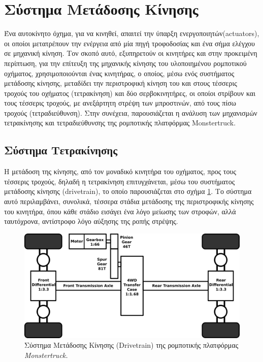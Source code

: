 \newpage
\section{Σύστημα Μετάδοσης Κίνησης} \label{sec:motion_transfer_system}
Ένα αυτοκίνητο όχημα, για να κινηθεί, απαιτεί την ύπαρξη {ενεργοποιητών(actuators)}, οι οποίοι μετατρέπουν την ενέργεια από μία πηγή τροφοδοσίας και ένα σήμα ελέγχου σε μηχανική κίνηση. Τον σκοπό αυτό, εξυπηρετούν οι κινητήρες και στην προκειμένη περίπτωση, για την επίτευξη της μηχανικής κίνησης του υλοποιημένου ρομποτικού οχήματος, χρησιμοποιούνται ένας κινητήρας, ο οποίος, μέσω ενός συστήματος μετάδοσης κίνησης, μεταδίδει την περιστροφική κίνηση του και στους τέσσερις τροχούς του οχήματος ({τετρακίνηση}) και δύο σερβοκινητήρες, οι οποίοι στρίβουν και τους τέσσερις τροχούς, με ανεξάρτητη στρέψη των μπροστινών, από τους πίσω τροχούς  ({τετραδιεύθυνση}). Στην συνέχεια, παρουσιάζεται η ανάλυση των μηχανισμών {τετρακίνησης} και {τετραδιεύθυνσης} της ρομποτικής πλατφόρμας {Monstertruck}.


\bigskip
\subsection{Σύστημα Τετρακίνησης} \label{ssec:four_wheel_drive}
Η μετάδοση της κίνησης, από τον μοναδικό κινητήρα του οχήματος, προς τους τέσσερις τροχούς, δηλαδή η τετρακίνηση επιτυγχάνεται, μέσω του {συστήματος μετάδοσης κίνησης (drivetrain)}, το οποίο παρουσιάζεται στο σχήμα \ref{fig:drivetrain}. Το σύστημα αυτό περιλαμβάνει, συνολικά, τέσσερα στάδια μετάδοσης της περιστροφικής κίνησης του κινητήρα, όπου κάθε στάδιο εισάγει ένα λόγο μείωσης των στροφών, αλλά ταυτόχρονα, αντίστροφο λόγο αύξησης της ροπής στρέψης.

\bigskip
\begin{figure}[!ht]
	\centering
	\includegraphics[width=0.8\linewidth]{Chapters/Chapter2/Figures/drivetrain.png}
	\caption{Σύστημα Μετάδοσης Κίνησης (Drivetrain) της ρομποτικής πλατφόρμας \textit{Monstertruck.}}
	\label{fig:drivetrain}
\end{figure}

